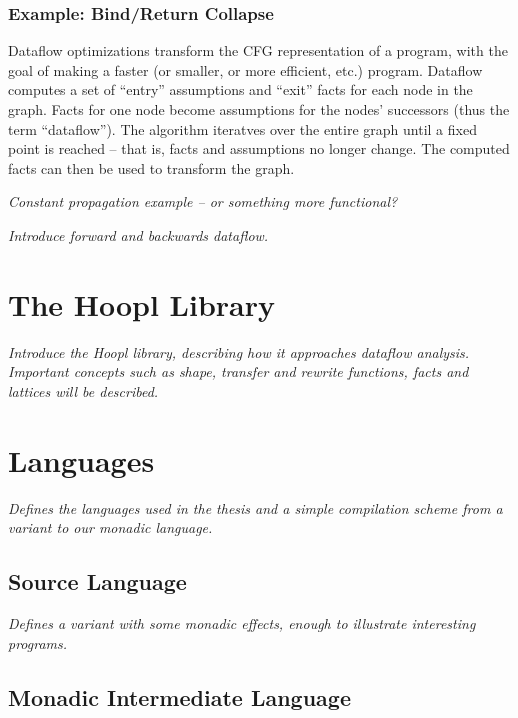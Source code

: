 \documentclass[12pt]{report}
\begin{document}
\subsection{Example: Bind/Return Collapse}

Dataflow optimizations transform the CFG representation of a program,
with the goal of making a faster (or smaller, or more efficient, etc.)
program. Dataflow computes a set of ``entry'' assumptions and ``exit''
facts for each node in the graph. Facts for one node become
assumptions for the nodes' successors (thus the term
``dataflow''). The algorithm iteratves over the entire graph until a
fixed point is reached -- that is, facts and assumptions no longer
change. The computed facts can then be used to transform the graph.

\emph{Constant propagation example -- or something more functional?}

\emph{Introduce forward and backwards dataflow.}




\chapter{The Hoopl Library}

\emph{Introduce the Hoopl library, describing how
it approaches dataflow analysis. Important concepts
such as shape, transfer and rewrite functions, facts and
lattices will be described. }

\chapter{Languages}

\emph{Defines the languages used in the thesis and a simple
  compilation scheme from a \lamA variant to our monadic language. }

\section{Source Language}

\emph{Defines a \lamA variant with some monadic effects, enough to
  illustrate interesting programs.}

\section{Monadic Intermediate Language}
\end{document}
